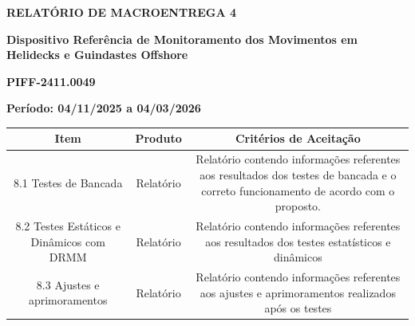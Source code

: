 \begin{center}
    \LARGE
    \textbf{RELATÓRIO DE MACROENTREGA 4}

    \vspace{0.6cm}
    \normalsize

    \begin{minipage}{.90\linewidth}
        \centering
        \textbf{
            Dispositivo Referência de Monitoramento dos Movimentos em Helidecks e Guindastes Offshore
        }
    
        \vspace{.6cm}
        \textbf{PIFF-2411.0049}
        \normalsize
    \end{minipage}
    
    \vspace{1.2cm}
    
    \begin{flushleft}
     \phantom{a.}\textbf{Período: 04/11/2025 a 04/03/2026}
    \end{flushleft}
    
    \begin{center}
    \small
    \begin{tabular}{|c|c|c|}
    \hline
        Item & Produto & Critérios de Aceitação \\
    \hline
        \multicolumn{1}{|m{5cm}|}{
            8.1 Testes de Bancada
        } 
        & \multicolumn{1}{m{3.5cm}|}{
            \centering
            Relatório
        } 
        & \multicolumn{1}{m{6.5cm}|}{
            Relatório contendo
            informações referentes aos
            resultados dos testes de
            bancada e o correto
            funcionamento de
            acordo com o proposto.
        }\\
    \hline
        \multicolumn{1}{|m{5cm}|}{
            8.2 Testes Estáticos e Dinâmicos com DRMM
        } 
        & \multicolumn{1}{m{3.5cm}|}{
            \centering
            Relatório 
        } 
        & \multicolumn{1}{m{6.5cm}|}{
            Relatório contendo
            informações referentes aos
            resultados dos testes
            estatísticos e dinâmicos
        }\\
    \hline
        \multicolumn{1}{|m{5cm}|}{
            8.3 Ajustes e aprimoramentos
        } 
        & \multicolumn{1}{m{3.5cm}|}{
            \centering
             Relatório
        } 
        & \multicolumn{1}{m{6.5cm}|}{
            Relatório contendo
            informações referentes aos
            ajustes e aprimoramentos
            realizados após os testes
        }\\
    \hline
    \end{tabular}
\end{center}


\end{center}
